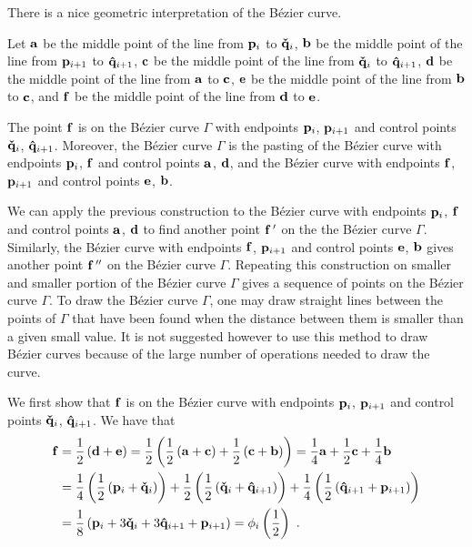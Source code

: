 \begin{rmk}
There is a nice geometric interpretation of the Bézier curve.

Let $\mathbf{a}$ be the middle point of the line from $\mathbf{p}_i$ to
$\mathbf{\check{q}}_i$, $\mathbf{b}$ be the middle point of the line from
$\mathbf{p}_{i+1}$ to $\mathbf{\hat{q}}_{i+1}$, $\mathbf{c}$ be the middle point of
the line from $\mathbf{\check{q}}_i$ to $\mathbf{\hat{q}}_{i+1}$, $\mathbf{d}$
be the middle point of the line from $\mathbf{a}$ to $\mathbf{c}$, $\mathbf{e}$
be the middle point of the line from $\mathbf{b}$ to $\mathbf{c}$, and
$\mathbf{f}$ be the middle point of the line from $\mathbf{d}$ to $\mathbf{e}$.

The point $\mathbf{f}$ is on the Bézier curve $\Gamma$ with endpoints
$\mathbf{p}_i$, $\mathbf{p}_{i+1}$ and control points $\mathbf{\check{q}}_i$,
$\mathbf{\hat{q}}_{i+1}$.  Moreover, the Bézier curve $\Gamma$ is the
pasting of the Bézier curve with endpoints $\mathbf{p}_i$, $\mathbf{f}$ and
control points $\mathbf{a}$, $\mathbf{d}$, and the Bézier curve with
endpoints $\mathbf{f}$, $\mathbf{p}_{i+1}$ and control points $\mathbf{e}$,
$\mathbf{b}$.

We can apply the previous construction to the Bézier curve with
endpoints $\mathbf{p}_i$, $\mathbf{f}$ and control points $\mathbf{a}$,
$\mathbf{d}$ to find another point $\mathbf{f}\,'$ on the the Bézier curve
$\Gamma$.  Similarly, the Bézier curve with endpoints $\mathbf{f}$,
$\mathbf{p}_{i+1}$ and control points $\mathbf{e}$, $\mathbf{b}$ gives another
point $\mathbf{f}\,''$ on the Bézier curve $\Gamma$.  Repeating this
construction on smaller and smaller portion of the Bézier curve
$\Gamma$ gives a sequence of points on the Bézier curve
$\Gamma$.  To draw the Bézier curve $\Gamma$, one may draw straight
lines between the points of $\Gamma$ that have been found when the
distance between them is smaller than a given small value.  It is not
suggested however to use this method to draw Bézier curves because
of the large number of operations needed to draw the curve.

We first show that $\mathbf{f}$ is on the Bézier curve with endpoints
$\mathbf{p}_i$, $\mathbf{p}_{i+1}$ and control points $\mathbf{\check{q}}_i$,
$\mathbf{\hat{q}}_{i+1}$.  We have that
\begin{align*}
\mathbf{f} & = \frac{1}{2} \left(\mathbf{d}+\mathbf{e}\right)
= \frac{1}{2} \left( \frac{1}{2}\left(\mathbf{a}+\mathbf{c}\right) +
\frac{1}{2}\left(\mathbf{c}+\mathbf{b}\right) \right)
= \frac{1}{4} \mathbf{a} + \frac{1}{2} \mathbf{c} + \frac{1}{4} \mathbf{b} \\
 & = \frac{1}{4} \left(\frac{1}{2}\left(\mathbf{p}_i
+\mathbf{\check{q}}_i\right)\right)
+ \frac{1}{2} \left(\frac{1}{2}\left(\mathbf{\check{q}}_i
+\mathbf{\hat{q}}_{i+1}\right)\right)
+ \frac{1}{4} \left(\frac{1}{2}\left(\mathbf{\hat{q}}_{i+1}
+\mathbf{p}_{i+1}\right)\right) \\
& = \frac{1}{8} \left( \mathbf{p}_i + 3 \mathbf{\check{q}}_i
+ 3 \mathbf{\hat{q}}_{i+1} + \mathbf{p}_{i+1} \right)
= \mathbf{\phi}_i\left(\frac{1}{2}\right)\ .
\end{align*}


\end{rmk}
